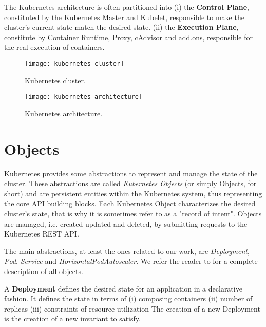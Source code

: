 The Kubernetes architecture is often partitioned into
(i) the \textbf{Control Plane}, constituted by the Kubernetes Master and Kubelet, responsible to make the cluster’s current state match the desired state.
(ii) the \textbf{Execution Plane}, constitute by Container Runtime, Proxy, cAdvisor and add.ons, responsible for the real execution of containers.

\begin{figure}	
	\label{fig:kubernetes-cluster}
	\centering
	\texttt{[image: kubernetes-cluster]}
	\caption{Kubernetes cluster.}
\end{figure}

\begin{figure}	
	\label{fig:kubernetes-architecture}
	\centering
	\texttt{[image: kubernetes-architecture]}
	\caption{Kubernetes architecture.}
\end{figure}


\section{Objects}
\label{sec:kubernetes-objects}
Kubernetes provides some abstractions to represent and manage the state of the cluster.
%
These abstractions are called \textit{Kubernetes Objects} (or simply Objects, for short) and are persistent entities within the Kubernetes system, thus representing the core API building blocks.
%
Each Kubernetes Object characterizes the desired cluster's state, that is why it is sometimes refer to as a "record of intent".
%
Objects are managed, i.e. created updated and deleted, by submitting requests to the Kubernetes REST API.

The main abstractions, at least the ones related to our work, are \textit{Deployment}, \textit{Pod}, \textit{Service} and \textit{HorizontalPodAutoscaler}.
%
We refer the reader to \cite{kubernetes-web} for a complete description of all objects.

A \textbf{Deployment} defines the desired state for an application in a declarative fashion.
%
It defines the state in terms of 
(i) composing containers 
(ii) number of replicas
(iii) constraints of resource utilization
%
The creation of a new Deployment is the creation of a new invariant to satisfy.

